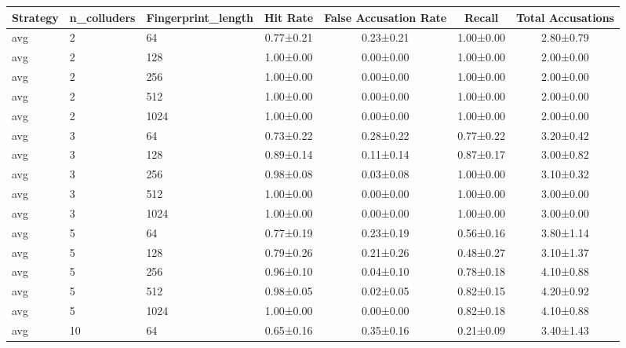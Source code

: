 \begin{tabular}{lllcccc}
\toprule
Strategy & n\_colluders & Fingerprint\_length & Hit Rate & False Accusation Rate & Recall & Total Accusations \\
\midrule
avg      & 2            & 64                  & 0.77±0.21  & 0.23±0.21              & 1.00±0.00 & 2.80±0.79 \\
avg      & 2            & 128                 & 1.00±0.00  & 0.00±0.00              & 1.00±0.00 & 2.00±0.00 \\
avg      & 2            & 256                 & 1.00±0.00  & 0.00±0.00              & 1.00±0.00 & 2.00±0.00 \\
avg      & 2            & 512                 & 1.00±0.00  & 0.00±0.00              & 1.00±0.00 & 2.00±0.00 \\
avg      & 2            & 1024                & 1.00±0.00  & 0.00±0.00              & 1.00±0.00 & 2.00±0.00 \\
avg      & 3            & 64                  & 0.73±0.22  & 0.28±0.22              & 0.77±0.22 & 3.20±0.42 \\
avg      & 3            & 128                 & 0.89±0.14  & 0.11±0.14              & 0.87±0.17 & 3.00±0.82 \\
avg      & 3            & 256                 & 0.98±0.08  & 0.03±0.08              & 1.00±0.00 & 3.10±0.32 \\
avg      & 3            & 512                 & 1.00±0.00  & 0.00±0.00              & 1.00±0.00 & 3.00±0.00 \\
avg      & 3            & 1024                & 1.00±0.00  & 0.00±0.00              & 1.00±0.00 & 3.00±0.00 \\
avg      & 5            & 64                  & 0.77±0.19  & 0.23±0.19              & 0.56±0.16 & 3.80±1.14 \\
avg      & 5            & 128                 & 0.79±0.26  & 0.21±0.26              & 0.48±0.27 & 3.10±1.37 \\
avg      & 5            & 256                 & 0.96±0.10  & 0.04±0.10              & 0.78±0.18 & 4.10±0.88 \\
avg      & 5            & 512                 & 0.98±0.05  & 0.02±0.05              & 0.82±0.15 & 4.20±0.92 \\
avg      & 5            & 1024                & 1.00±0.00  & 0.00±0.00              & 0.82±0.18 & 4.10±0.88 \\
avg      & 10           & 64                  & 0.65±0.16  & 0.35±0.16              & 0.21±0.09 & 3.40±1.43 \\

\end{tabular}

